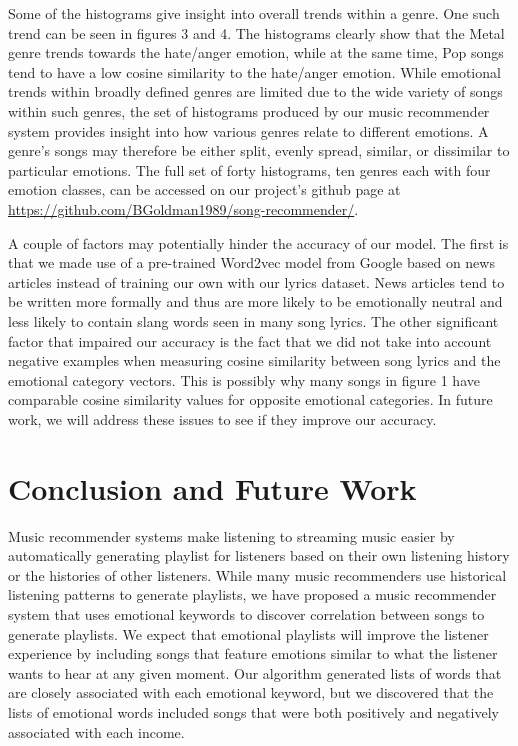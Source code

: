\documentclass[10pt,twocolumn]{article}
\begin{document}
Some of the histograms give insight into overall trends within a genre. One such trend can be seen in figures 3 and 4. The histograms clearly show that the Metal genre trends towards the hate/anger emotion, while at the same time, Pop songs tend to have a low cosine similarity to the hate/anger emotion. While emotional trends within broadly defined genres are limited due to the wide variety of songs within such genres, the set of histograms produced by our music recommender system provides insight into how various genres relate to different emotions.  A genre's songs may therefore be either split, evenly spread, similar, or dissimilar to particular emotions. The full set of forty histograms, ten genres each with four emotion classes, can be accessed on our project's github page at \url{https://github.com/BGoldman1989/song-recommender/}.

A couple of factors may potentially hinder the accuracy of our model.  The first is that we made use of a pre-trained Word2vec model from Google based on news articles \cite{a17} instead of training our own with our lyrics dataset.  News articles tend to be written more formally and thus are more likely to be emotionally neutral and less likely to contain slang words seen in many song lyrics.  The other significant factor that impaired our accuracy is the fact that we did not take into account negative examples when measuring cosine similarity between song lyrics and the emotional category vectors.  This is possibly why many songs in figure 1 have comparable cosine similarity values for opposite emotional categories.  In future work, we will address these issues to see if they improve our accuracy.

\section{Conclusion and Future Work}
Music recommender systems make listening to streaming music easier by automatically generating playlist for listeners based on their own listening history or the histories of other listeners.  While many music recommenders use historical listening patterns to generate playlists, we have proposed a music recommender system that uses emotional keywords to discover correlation between songs to generate playlists.  We expect that emotional playlists will improve the listener experience by including songs that feature emotions similar to what the listener wants to hear at any given moment.  Our algorithm generated lists of words that are closely associated with each emotional keyword, but we discovered that the lists of emotional words included songs that were both positively and negatively associated with each income.
\end{document}
